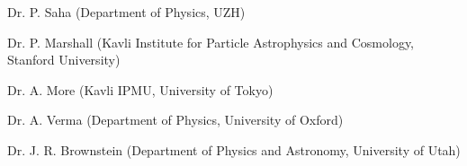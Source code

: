 \documentclass[margin,line]{resume}
\begin{document}
\begin{resume}
\begin{list2}
  \item Dr. P. Saha (Department of Physics, UZH)
  \item Dr. P. Marshall (Kavli Institute for Particle Astrophysics and Cosmology, Stanford University)
  \item Dr. A. More (Kavli IPMU, University of Tokyo)
  \item Dr. A. Verma (Department of Physics, University of Oxford)
  \item Dr. J. R. Brownstein (Department of Physics and Astronomy, University of Utah)
\end{list2}



%
%






\end{resume}
\end{document}
